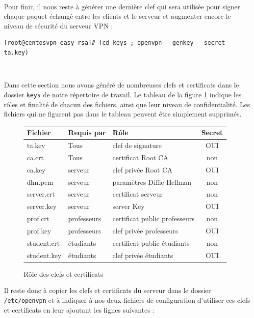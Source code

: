 ~

Pour finir, il nous reste à générer une dernière clef qui sera utilisée pour signer chaque paquet échangé entre les clients et le serveur et augmenter encore le niveau de sécurité du serveur VPN :

\verb|[root@centosvpn easy-rsa]# (cd keys ; openvpn --genkey --secret ta.key)|

~

Dans cette section nous avons généré de nombreuses clefs et certificats dans le dossier \verb|keys| de notre répertoire de travail. Le tableau de la figure \ref{easy-rsa-clefs} indique les rôles et finalité de chacun des fichiers, ainsi que leur niveau de confidentialité. Les fichiers qui ne figurent pas dans le tableau peuvent être simplement supprimés.

\begin{figure}[H]
	\begin{center}
		\begin{tabular}{l|l|l|c}
			Fichier		& Requis par	& Rôle							& Secret\\
			\hline
			ta.key		& Tous			& clef de signature				& OUI\\
			ca.crt		& Tous			& certificat Root CA			& non\\
			ca.key		& serveur		& clef privée Root CA			& OUI\\
			dh{n}.pem	& serveur		& paramètres Diffie Hellman		& non\\
			server.crt	& serveur		& certificat serveur			& non\\
			server.key	& serveur		& server Key					& OUI\\
			prof.crt	& professeurs	& certificat public professeurs	& non\\
			prof.key	& professeurs	& clef privée professeurs		& OUI\\
			student.crt	& étudiants		& certificat public étudiants	& non\\
			student.key	& étudiants		& clef privée étudiants			& OUI\\
		\end{tabular}
	\end{center}
	\caption{Rôle des clefs et certificats}
	\label{easy-rsa-clefs}
\end{figure}

Il reste donc à copier les clefs et certificats du serveur dans le dossier \verb|/etc/openvpn| et à indiquer à nos deux fichiers de configuration d'utiliser ces clefs et certificats en leur ajoutant les lignes suivantes :

